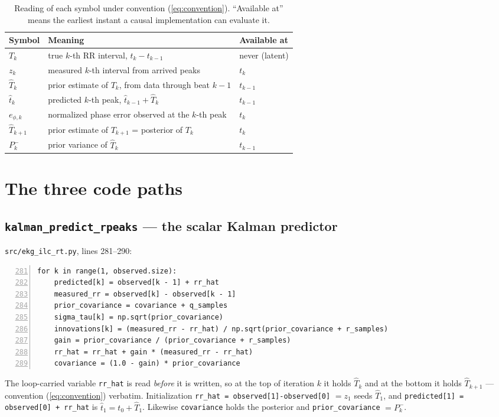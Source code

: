 \documentclass[11pt]{article}
\newcommand{\Th}{\widehat{T}}
\newcommand{\tht}{\widehat{t}}
\newcommand{\code}[1]{\texttt{\small #1}}
\begin{document}
\begin{table}[t]
\centering
\caption{Reading of each symbol under convention (\ref{eq:convention}). ``Available at''
means the earliest instant a causal implementation can evaluate it.}
\label{tab:symbols}
\small
\begin{tabular}{@{}l l l@{}}
\toprule
Symbol & Meaning & Available at \\
\midrule
$T_k$        & true $k$-th RR interval, $t_k-t_{k-1}$                     & never (latent) \\
$z_k$        & measured $k$-th interval from arrived peaks                & $t_k$ \\
$\Th_k$      & prior estimate of $T_k$, from data through beat $k-1$      & $t_{k-1}$ \\
$\tht_k$      & predicted $k$-th peak, $\tht_{k-1}+\Th_k$                   & $t_{k-1}$ \\
$e_{\phi,k}$ & normalized phase error observed at the $k$-th peak         & $t_k$ \\
$\Th_{k+1}$  & prior estimate of $T_{k+1}$ = posterior of $T_k$            & $t_k$ \\
$P_k^-$      & prior variance of $\Th_k$                                   & $t_{k-1}$ \\
\bottomrule
\end{tabular}
\end{table}

\section{The three code paths}

\subsection{\code{kalman\_predict\_rpeaks} --- the scalar Kalman predictor}
\code{src/ekg\_ilc\_rt.py}, lines 281--290:
\begin{Verbatim}[fontsize=\scriptsize,numbers=left,firstnumber=281]
for k in range(1, observed.size):
    predicted[k] = observed[k - 1] + rr_hat
    measured_rr = observed[k] - observed[k - 1]
    prior_covariance = covariance + q_samples
    sigma_tau[k] = np.sqrt(prior_covariance)
    innovations[k] = (measured_rr - rr_hat) / np.sqrt(prior_covariance + r_samples)
    gain = prior_covariance / (prior_covariance + r_samples)
    rr_hat = rr_hat + gain * (measured_rr - rr_hat)
    covariance = (1.0 - gain) * prior_covariance
\end{Verbatim}
The loop-carried variable \code{rr\_hat} is read \emph{before} it is written, so at the top of
iteration $k$ it holds $\Th_k$ and at the bottom it holds $\Th_{k+1}$ --- convention
(\ref{eq:convention}) verbatim. Initialization \code{rr\_hat = observed[1]-observed[0]}
$=z_1$ seeds $\Th_1$, and \code{predicted[1] = observed[0] + rr\_hat} is $\tht_1=t_0+\Th_1$.
Likewise \code{covariance} holds the posterior and \code{prior\_covariance} $=P_k^-$.
\end{document}
